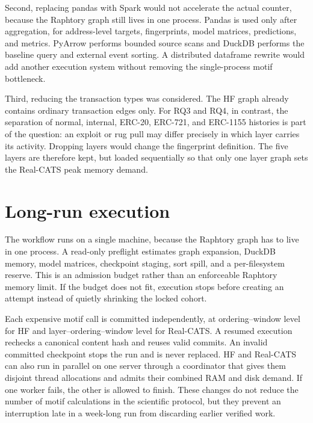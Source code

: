 Second, replacing pandas with Spark would not accelerate the actual counter,
because the Raphtory graph still lives in one process. Pandas is used only after
aggregation, for address-level targets, fingerprints, model matrices,
predictions, and metrics. PyArrow performs bounded source scans and DuckDB
performs the baseline query and external event sorting. A distributed dataframe
rewrite would add another execution system without removing the single-process
motif bottleneck.

Third, reducing the transaction types was considered. The HF graph already
contains ordinary transaction edges only. For RQ3 and RQ4, in contrast, the separation
of normal, internal, ERC-20, ERC-721, and ERC-1155 histories is part of the
question: an exploit or rug pull may differ precisely in which layer carries its
activity. Dropping layers would change the fingerprint definition. The five
layers are therefore kept, but loaded sequentially so that only one layer graph
sets the Real-CATS peak memory demand.

\section{Long-run execution}

The workflow runs on a single machine, because the Raphtory graph has to live in
one process. A read-only preflight estimates graph expansion, DuckDB memory,
model matrices, checkpoint staging, sort spill, and a per-filesystem reserve.
This is an admission budget rather than an enforceable Raphtory memory limit. If
the budget does not fit, execution stops before creating an attempt instead of
quietly shrinking the locked cohort.

Each expensive motif call is committed independently, at ordering--window level
for HF and layer--ordering--window level for Real-CATS. A resumed execution
rechecks a canonical content hash and reuses valid commits. An invalid committed
checkpoint stops the run and is never replaced. HF and Real-CATS can also run in
parallel on one server through a coordinator that gives them disjoint thread
allocations and admits their combined RAM and disk demand. If one worker fails,
the other is allowed to finish. These changes do not reduce the number of motif
calculations in the scientific protocol, but they prevent an interruption late
in a week-long run from discarding earlier verified work.

